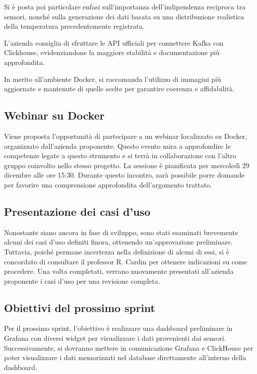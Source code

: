\documentclass{article}
\begin{document}
Si è posta poi particolare enfasi sull'importanza dell'indipendenza reciproca tra sensori, nonché sulla generazione dei dati basata su una distribuzione realistica della temperatura precedentemente registrata.  

L'azienda consiglia di sfruttare le API ufficiali per connettere Kafka con Clickhouse, evidenziandone la maggiore stabilità e documentazione più approfondita.  

In merito all'ambiente Docker, si raccomanda l'utilizzo di immagini più aggiornate e mantenute di quelle scelte per garantire coerenza e affidabilità.  

\subsection{Webinar su Docker}
Viene proposta l'opportunità di partecipare a un webinar focalizzato su Docker, organizzato dall'azienda proponente. Questo evento mira a approfondire le competenze legate a questo strumento e si terrà in collaborazione con l'altro gruppo coinvolto nello stesso progetto.  
La sessione è pianificata per mercoledì 29 dicembre alle ore 15:30. Durante questo incontro, sarà possibile porre domande per favorire una comprensione approfondita dell'argomento trattato. 

\subsection{Presentazione dei casi d'uso}
Nonostante siano ancora in fase di sviluppo, sono stati esaminati brevemente alcuni dei casi d'uso definiti finora, ottenendo un'approvazione preliminare.
Tuttavia, poiché permane incertezza nella definizione di alcuni di essi, si è concordato di consultare il professor R. Cardin per ottenere indicazioni su come procedere.  
Una volta completati, verrano nuovamente presentati all'azienda proponente i casi d'uso per una revisione completa.  

\subsection{Obiettivi del prossimo sprint}
Per il prossimo sprint, l'obiettivo è realizzare una dashboard preliminare in Grafana con diversi widget per visualizzare i dati provenienti dai sensori. Successivamente, si dovranno mettere in comunicazione Grafana e ClickHouse per poter visualizzare i dati memorizzati nel database direttamente all'interno della dashboard.  
\end{document}
